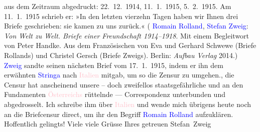 {{{                    aus dem Zeitraum abgedruckt: 22. 12. 1914, 11. 1. 1915, 5. 2. 1915.
                     Am 11. 1. 1915 schrieb er: »In den letzten vierzehn Tagen haben wir Ihnen drei Briefe geschrieben: sie kamen zu uns zurück.« (
                     \textcolor{blue}{Romain Rolland}, \textcolor{blue}{Stefan Zweig}: \emph{Von Welt zu Welt. Briefe
                           einer Freundschaft 1914–1918}. Mit einem Begleitwort von Peter
                        Handke. Aus dem Französischen von Eva und Gerhard Schwewe (Briefe Rollands) und
                        Christel Gersch (Briefe Zweigs). Berlin: \emph{Aufbau
                           Verlag}{ }2014.) \textcolor{blue}{Zweig} sandte seinen nächsten Brief vom 17. 1. 1915, indem er ihn dem erwähnten
                     \textcolor{blue}{Stringa} nach  \textcolor{pink}{Italien} mitgab, um 
                     so die Zensur zu umgehen.}}}\label{K_L03650-2}, die Censur hat anscheinend
               unsere – doch zweifellos staatsgefährliche und an den Fundamenten \textcolor{pink}{Österreichs}\ledrightnote{\textcolor{pink}{Österreich}} rüttelnde — Correspondenz unterbunden und
               abgedrosselt. Ich schreibe ihm über \textcolor{pink}{Italien}\ledrightnote{\textcolor{pink}{Italien}} und
               wende mich übrigens heute noch an die Briefcensur direct, um ihr den Begriff \textcolor{blue}{Romain Rolland}\ledrightnote{\textcolor{blue}{Romain Rolland}} aufzuklären. Hoffentlich
               ge­lingts! Viele viele Grüsse Ihres getreuen\pend
           \pstart \spacefill\mbox{Stefan Zweig}\pend{}\endnumbering{}  
      
